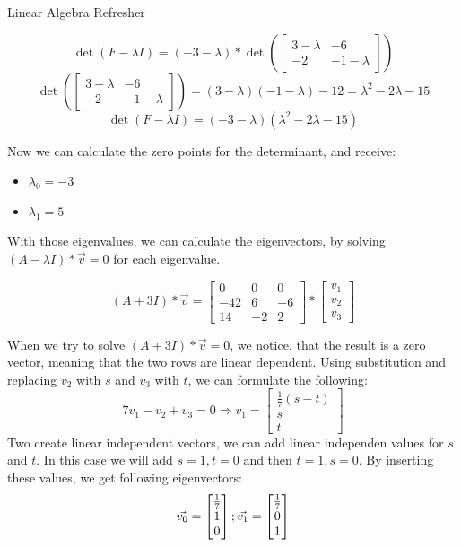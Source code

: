 \documentclass[
	english,
        solution=true
	]{tudaexercise}
\begin{document}
\begin{task}[points=28]{Linear Algebra Refresher}
\begin{subtask} [points=5,title=Matrix Decomposition]
\begin{solution}
    \[\det(F-\lambda I)=(-3-\lambda)*\det(\begin{bmatrix}
        3-\lambda & -6 \\ -2 & -1-\lambda
    \end{bmatrix})\]
    \[\det(\begin{bmatrix}
        3-\lambda & -6 \\ -2 & -1-\lambda
    \end{bmatrix})=(3-\lambda)(-1-\lambda)-12=\lambda^2-2\lambda-15\]
    \[\det(F-\lambda I)=(-3-\lambda)(\lambda^2-2\lambda-15)\]

Now we can calculate the zero points for the determinant, and receive:
\begin{itemize}
    \item $\lambda_0=-3$
    \item $\lambda_1=5$
\end{itemize}

With those eigenvalues, we can calculate the eigenvectors, by solving $(A-\lambda I)*\vec{v}=0$ for each eigenvalue.

\[(A+3I)*\vec{v} = \begin{bmatrix}
        0 & 0 & 0 \\ -42 & 6 & -6 \\ 14 & -2 & 2
    \end{bmatrix}*\begin{bmatrix}
        v_1 \\v_2 \\v_3
    \end{bmatrix}\]

    When we try to solve $(A+3I)*\vec{v}=0$, we notice, that the result is a zero vector, meaning that the two rows are linear dependent.
    Using substitution and replacing $v_2$ with $s$ and $v_3$ with $t$, we can formulate the following:
    \[7v_1-v_2+v_3=0 \Rightarrow v_1=\begin{bmatrix}
        \frac{1}{7}(s-t) \\ s \\ t
    \end{bmatrix}\]
    Two create linear independent vectors, we can add linear independen values for $s$ and $t$. In this case we will add $s=1, t=0$ and then $t=1, s=0$. By inserting these values, we get following eigenvectors:
    \[\vec{v_0}=\begin{bmatrix}
        \frac{1}{7} \\ 1 \\ 0
    \end{bmatrix}; \vec{v_1}=\begin{bmatrix}
        \-\frac{1}{7} \\ 0 \\ 1
    \end{bmatrix}\]


\end{solution}
\end{subtask}
\end{task}
\end{document}
